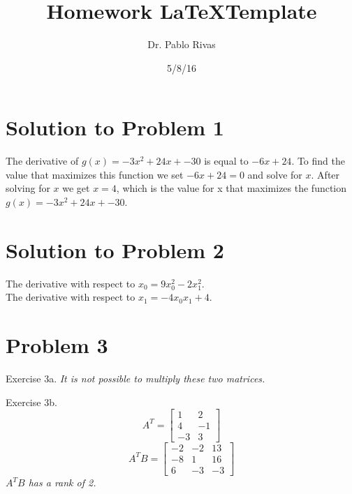 \documentclass[a4paper]{article}
\title{Homework \LaTeX Template}
\author{Dr. Pablo Rivas}
\date{5/8/16}
\newenvironment{exercise}[1][]{%
  \bigskip                          %
  \noindent \textsf{Exercise #1.\quad}\slshape }{}
\begin{document}
\lstset{language=Python}

\maketitle

\section{Solution to Problem 1}
The derivative of $g(x) = -3x^2 + 24x + - 30$ is equal to $-6x +24$.
To find the value that maximizes this function we set $-6x + 24 = 0$ and solve for $x$. After solving for $x$ we get $x=4$, which is the value for x that maximizes the function $g(x) = -3x^2 + 24x + - 30$.
\section{Solution to Problem 2}
The derivative with respect to $x_0 = 9x^2_0 - 2x^2_1$. \\
The derivative with respect to $x_1 = -4x_0x_1 + 4$.

\section{Problem 3}
\begin{exercise}[3a]
It is not possible to multiply these two matrices.
\end{exercise}

\begin{exercise}[3b]
\[ A^T=
			\begin{bmatrix}
			1 & 2 \\
			4 & -1 \\
			-3 & 3
			\end{bmatrix}
\]
\[A^TB=
			\begin{bmatrix}
			-2 & -2 & 13 \\
			-8 & 1 & 16 \\
			6 & -3 & -3
			\end{bmatrix}
\]
$A^TB$ has a rank of 2.
\end{exercise}
\end{document}
